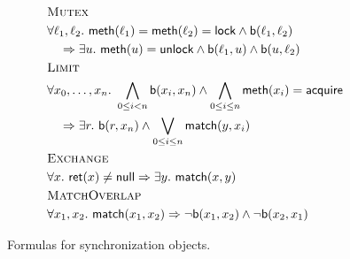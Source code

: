 \begin{figure}
  \footnotesize
  \begin{align*}
    & \textsc{Mutex} \\
    & \forall \ell_1, \ell_2.\ {\sf meth}(\ell_1) = {\sf meth}(\ell_2) = {\sf lock} \land {\sf b}(\ell_1,\ell_2) \\
    & \quad \implies \exists u.\ {\sf meth}(u) = {\sf unlock} \land {\sf b}(\ell_1,u) \land {\sf b}(u,\ell_2)
    \\
    & \textsc{Limit} \\
    & \forall x_0,\dots,x_n.\ \bigwedge_{0 \leq i < n} {\sf b}(x_i,x_n) \land \bigwedge_{0 \leq i \leq n} {\sf meth}(x_i) = {\sf acquire} \\
    & \quad \implies \exists r.\ {\sf b}(r,x_n) \land \bigvee_{0 \leq i \leq n} {\sf match}(y,x_i)
    \\
    & \textsc{Exchange} \\
    & \forall x.\ {\sf ret}(x) \neq {\sf null} \implies  \exists y.\ {\sf match}(x,y)  \\
    & \textsc{MatchOverlap} \\
    & \forall x_1,x_2.\ {\sf match}(x_1,x_2) \implies \neg {\sf b}(x_1,x_2) \land \neg {\sf b}(x_2,x_1) 
  \end{align*}
  \caption{Formulas for synchronization objects.}
  \label{fig:formulas:synchronization}
\end{figure}




%
%
%


